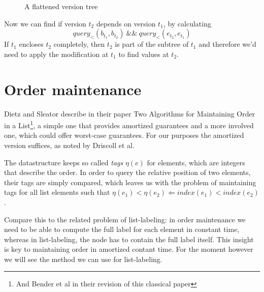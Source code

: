 \documentclass[11pt]{Thesis}
\theoremstyle{definition}
\newcommand{\seclabel}[1]{\label{sec:#1}}
\begin{document}
\begin{figure}[htpb]
  \caption{A flattened version tree}
  \label{fig:flattening-tree}
\end{figure}

Now we can find if version $t_2$ depends on version $t_1$, by calculating 
\[ query_<(b_{t_1}, b_{t_2})\ \mathrm{\&\&}\ query_<(e_{t_2}, e_{t_1})\]
If $t_1$ encloses $t_2$ completely, then $t_2$ is part of the subtree of $t_1$
and therefore we'd need to apply the modification at $t_1$ to find values at
$t_2$.

\section{Order maintenance}\seclabel{order-maintenance}
Dietz and Sleator describe in their paper Two Algorithms for Maintaining 
Order in a List\cite{Diet87b}\footnote{And Bender et al\cite{Bend02a} in 
their revision of this classical paper}, a simple one that provides amortized 
guarantees and a more involved one, which could offer worst-case guarantees. 
For our purposes the amortized version suffices, as noted by Driscoll et
al\cite[p. 108]{Dris89a}.

The datastructure keeps so called \emph{tags} $\eta(e)$ for elements, which are 
integers that describe the order. In order to query the relative position of 
two elements, their tags are simply compared, which leaves us with the 
problem of maintaining tags for all list elements such that 
$\eta(e_1)<\eta(e_2) \Leftarrow index(e_1) < index(e_2)$.

Compare this to the related problem of list-labeling: in order maintenance we 
need to be able to compute the full label for each element in constant time, 
whereas in list-labeling, the node has to contain the full label itself. This 
insight is key to maintaining order in amortized contant time. For the moment 
however we will see the method we can use for list-labeling.
\end{document}
